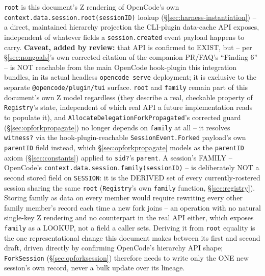 \documentclass[a4paper,10pt,fleqn]{article}
\newcommand{\field}[1]{\texttt{#1}}
\begin{document}
\field{root} is this document's Z rendering of OpenCode's own
\field{context.data.session.root(sessionID)} lookup
(\S\ref{sec:harness-instantiation}) -- a direct, maintained hierarchy
projection the CLI-plugin data-cache API exposes, independent of
whatever fields a \field{session.created} event payload happens to
carry. \textbf{Caveat, added by review:} that API is confirmed to
EXIST, but -- per \S\ref{sec:nongoals}'s own corrected citation of the
companion PR/FAQ's ``Finding 6'' -- is NOT reachable from the main
OpenCode hook-plugin this integration bundles, in its actual headless
\field{opencode serve} deployment; it is exclusive to the separate
\field{@opencode/plugin/tui} surface. \field{root} and \field{family}
remain part of this document's own Z model regardless (they describe a
real, checkable property of \field{Registry}'s state, independent of
which real API a future implementation reads to populate it), and
\field{AllocateDelegationForkPropagated}'s corrected guard
(\S\ref{sec:opforkpropagate}) no longer depends on \field{family} at
all -- it resolves \field{witness?} via the hook-plugin-reachable
\field{SessionEvent.Forked} payload's own \field{parentID} field
instead, which \S\ref{sec:opforkpropagate} models as the
\field{parentID} axiom (\S\ref{sec:constants}) applied to
\field{sid?}'s \field{parent}. A session's FAMILY -- OpenCode's
\field{context.data.session.family(sessionID)} -- is deliberately NOT
a second stored field on \field{SESSION}: it is the DERIVED set of
every currently-rostered session sharing the same \field{root}
(\field{Registry}'s own \field{family} function,
\S\ref{sec:registry}). Storing family as data on every member would
require rewriting every other family member's record each time a new
fork joins -- an operation with no natural single-key Z rendering and
no counterpart in the real API either, which exposes \field{family} as
a LOOKUP, not a field a caller sets. Deriving it from \field{root}
equality is the one representational change this document makes
between its first and second draft, driven directly by confirming
OpenCode's hierarchy API shape; \field{ForkSession}
(\S\ref{sec:opforksession}) therefore needs to write only the ONE new
session's own record, never a bulk update over its lineage.
\end{document}
